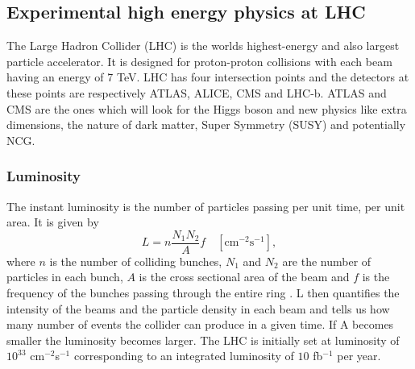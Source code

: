 \subsection{Experimental high energy physics at LHC} \label{sec:lhc}
The Large Hadron Collider (LHC) is the worlds highest-energy and also largest particle accelerator. It is designed for proton-proton collisions with each beam having an energy of 7 TeV. LHC has four intersection points and the detectors at these points are respectively ATLAS, ALICE, CMS and LHC-b. ATLAS and CMS are the ones which will look for the Higgs boson and new physics like extra dimensions, the nature of dark matter, Super Symmetry (SUSY) and potentially NCG.

\subsubsection{Luminosity}
The instant luminosity is the number of particles passing per unit time, per unit area. It is given by
\begin{equation}
	L=n\frac{N_{1}N_{2}}{A}f \quad [\mbox{cm}^{-2}\mbox{s}^{-1}],
\end{equation}
where $n$ is the number of colliding bunches, $N_{1}$ and $N_{2}$ are the number of particles in each bunch, $A$ is the cross sectional area of the beam and $f$ is the frequency of the bunches passing through the entire ring \cite{martin1998pp}. L then quantifies the intensity of the beams and the particle density in each beam and tells us how many number of events the collider can produce in a given time. If A becomes smaller the luminosity becomes larger. The LHC is initially set at luminosity of $10^33$ cm$^{-2}$s$^{-1}$ corresponding to an integrated luminosity of $10$ fb$^{-1}$ per year.

